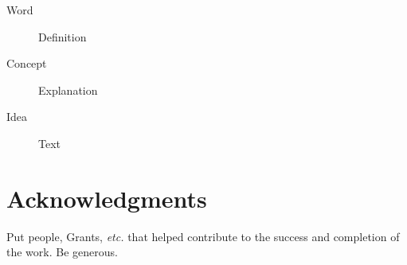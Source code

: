 \documentclass[fleqn,10pt]{SelfArx} %
\begin{document}
\begin{description}
\item[Word] Definition
\item[Concept] Explanation
\item[Idea] Text
\end{description}

\section*{Acknowledgments} %
Put people, Grants, \textit{etc.} that helped contribute to the success and completion of the work.  Be generous.






\end{document}
